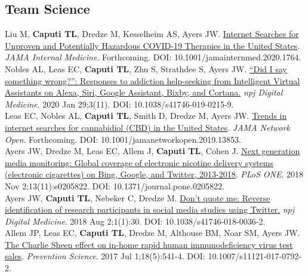 \documentclass[11pt, letterpaper]{article}
\newcommand{\years}[1]{\marginnote{\normalsize #1}}
\begin{document}
\subsection*{Team Science}
\noindent
\years{2020}Liu M, \textbf{Caputi TL}, Dredze M, Kesselheim AS, Ayers JW. \href{https://dx.doi.org/10.1001/jamainternmed.2020.1764}{Internet Searches for Unproven and Potentially Hazardous COVID-19 Therapies in the United States}. \textit{JAMA Internal Medicine}. Forthcoming. DOI: 10.1001/jamainternmed.2020.1764. \\[.2cm]
\years{2020}Nobles AL, Leas EC, \textbf{Caputi TL}, Zhu S, Strathdee S, Ayers JW. \href{https://dx.doi.org/10.1038/s41746-019-0215-9}{“Did I say something wrong?”: Responses to addiction help-seeking from Intelligent Virtual Assistants on Alexa, Siri, Google Assistant, Bixby, and Cortana.} \textit{npj Digital Medicine}. 2020 Jan 29;3(11). DOI: 10.1038/s41746-019-0215-9.\\[.2cm]
\years{2019}Leas EC, Nobles AL, \textbf{Caputi TL}, Smith D, Dredze M, Ayers JW. \href{https://dx.doi.org/10.1001/jamanetworkopen.2019.13853}{Trends in internet searches for cannabidiol (CBD) in the United States}. \textit{JAMA Network Open}. Forthcoming. DOI: 10.1001/jamanetworkopen.2019.13853.\\[.2cm]
\years{2018}Ayers JW, Dredze M, Leas EC, Allem J, \textbf{Caputi TL},  Cohen J. \href{https://dx.doi.org/10.1371/journal.pone.0205822}{Next generation media monitoring: Global coverage of electronic nicotine delivery systems (electronic cigarettes) on Bing, Google, and Twitter, 2013-2018}. \textit{PLoS ONE}. 2018 Nov 2;13(11):e0205822. DOI: 10.1371/journal.pone.0205822.\\[.2cm]
\years{2018}Ayers JW, \textbf{Caputi TL}, Nebeker C, Dredze M. \href{https://dx.doi.org/10.1038/s41746-018-0036-2}{Don't quote me: Reverse identification of research participants in social media studies using Twitter.} \textit{npj Digital Medicine}. 2018 Aug 2;1(1):30. DOI: 10.1038/s41746-018-0036-2.\\[.2cm]
\years{2017}Allem JP, Leas EC, \textbf{Caputi TL}, Dredze M, Althouse BM, Noar SM, Ayers JW. \href{http://dx.doi.org/10.1007/s11121-017-0792-2}{The Charlie Sheen effect on in-home rapid human immunodeficiency virus test sales}. \textit{Prevention Science}. 2017 Jul 1;18(5):541-4. DOI:  10.1007/s11121-017-0792-2.\\[.2cm]
\end{document}
